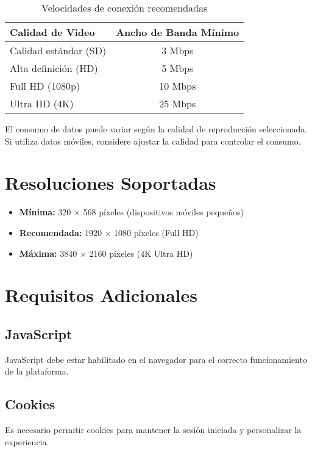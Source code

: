 \documentclass[11pt,a4paper,twoside]{book}
\begin{document}
\begin{table}[h]
\centering
\begin{tabular}{@{}lc@{}}
\toprule
\textbf{Calidad de Video} & \textbf{Ancho de Banda Mínimo} \\ \midrule
Calidad estándar (SD)     & 3 Mbps                         \\
Alta definición (HD)      & 5 Mbps                         \\
Full HD (1080p)           & 10 Mbps                        \\
Ultra HD (4K)             & 25 Mbps                        \\ \bottomrule
\end{tabular}
\caption{Velocidades de conexión recomendadas}
\end{table}

\begin{warningbox}
El consumo de datos puede variar según la calidad de reproducción seleccionada. Si utiliza datos móviles, considere ajustar la calidad para controlar el consumo.
\end{warningbox}

\section{Resoluciones Soportadas}

\begin{itemize}
    \item \textbf{Mínima:} 320 × 568 píxeles (dispositivos móviles pequeños)
    \item \textbf{Recomendada:} 1920 × 1080 píxeles (Full HD)
    \item \textbf{Máxima:} 3840 × 2160 píxeles (4K Ultra HD)
\end{itemize}

\section{Requisitos Adicionales}

\subsection{JavaScript}
JavaScript debe estar habilitado en el navegador para el correcto funcionamiento de la plataforma.

\subsection{Cookies}
Es necesario permitir cookies para mantener la sesión iniciada y personalizar la experiencia.
\end{document}
